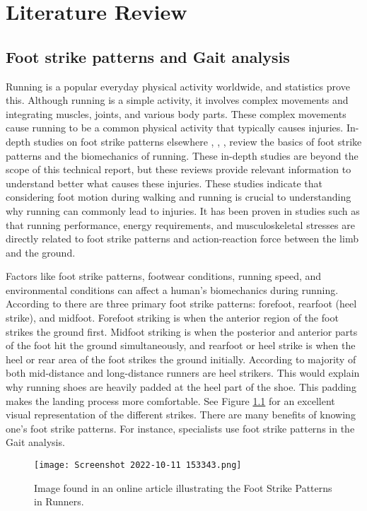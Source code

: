 \graphicspath{{litreview/fig/}}

\chapter{Literature Review}
\label{chap:litreview}
\section{Foot strike patterns and Gait analysis}
\label{sec:Gait}
Running is a popular everyday physical activity worldwide, and statistics prove this\cite{statistaresearchdepartment2020}. Although running is a simple activity, it involves complex movements and integrating muscles, joints, and various body parts. These complex movements cause running to be a common physical activity that typically causes injuries. In-depth studies on foot strike patterns elsewhere \cite{doi:10.2519/jospt.2015.6019}, \cite{CAVANAGH1980397
}, \cite{matheuso.almeidaptphdirenes.davisptphdalexandred.lopesptphd2015}, \cite{lauram.andersondanielr.bonannoharvif.hart&christianj.barton2020} review the basics of foot strike patterns and the biomechanics of running. These in-depth studies are beyond the scope of this technical report, but these reviews provide relevant information to understand better what causes these injuries. These studies indicate that considering foot motion during walking and running is crucial to understanding why running can commonly lead to injuries. It has been proven in studies such as \cite{kennethp.clarklaurencej.ryanpeterg.weyand2014} that running performance, energy requirements, and musculoskeletal stresses are directly related to foot strike patterns and action-reaction force between the limb and the ground. 

Factors like foot strike patterns, footwear conditions, running speed, and environmental conditions can affect a human's biomechanics during running. According to \cite{matheuso.almeidaptphdirenes.davisptphdalexandred.lopesptphd2015} there are three primary foot strike patterns: forefoot, rearfoot (heel strike), and midfoot. Forefoot striking is when the anterior region of the foot strikes the ground first. Midfoot striking is when the posterior and anterior parts of the foot hit the ground simultaneously, and rearfoot or heel strike is when the heel or rear area of the foot strikes the ground initially. According to \cite{marEfootstrike} \cite{matheuso.almeidaptphdirenes.davisptphdalexandred.lopesptphd2015} majority of both mid-distance and long-distance runners are heel strikers. This would explain why running shoes are heavily padded at the heel part of the shoe. This padding makes the landing process more comfortable. See Figure \ref{fig:footstrike} for an excellent visual representation of the different strikes. There are many benefits of knowing one's foot strike patterns. For instance, specialists use foot strike patterns in the Gait analysis.
\clearpage
\begin{figure}[!htb]
    \centering
    \texttt{[image: Screenshot 2022-10-11 153343.png]}
    \caption{Image found in an online article\cite{mass4d2017} illustrating the Foot Strike Patterns in Runners.}
    \label{fig:footstrike}
\end{figure}

